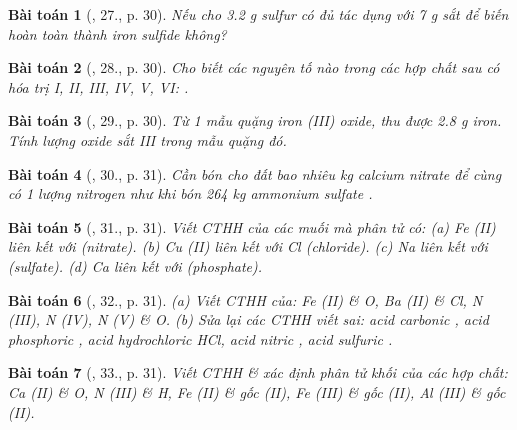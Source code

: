 \documentclass{article}
\newtheorem{baitoan}{Bài toán}
\begin{document}
\begin{baitoan}[\cite{An_Hoa_Hoc_nang_cao_8_9}, 27., p. 30]
	Nếu cho {\rm3.2 g} sulfur có đủ tác dụng với {\rm7 g} sắt để biến hoàn toàn thành iron sulfide không?
\end{baitoan}

\begin{baitoan}[\cite{An_Hoa_Hoc_nang_cao_8_9}, 28., p. 30]
	Cho biết các nguyên tố nào trong các hợp chất sau có hóa trị {\rm I, II, III, IV, V, VI: }.
\end{baitoan}

\begin{baitoan}[\cite{An_Hoa_Hoc_nang_cao_8_9}, 29., p. 30]
	Từ 1 mẫu quặng iron (III) oxide, thu được {\rm2.8 g} iron. Tính lượng oxide sắt III trong mẫu quặng đó.
\end{baitoan}

\begin{baitoan}[\cite{An_Hoa_Hoc_nang_cao_8_9}, 30., p. 31]
	Cần bón cho đất bao nhiêu {\rm kg} calcium nitrate để cùng có 1 lượng nitrogen như khi bón {\rm264 kg} ammonium sulfate {\rm{}}.
\end{baitoan}

\begin{baitoan}[\cite{An_Hoa_Hoc_nang_cao_8_9}, 31., p. 31]
	Viết {\rm CTHH} của các muối mà phân tử có: (a) {\rm Fe (II)} liên kết với {\rm{}} (nitrate). (b) {\rm Cu (II)} liên kết với {\rm Cl} (chloride). (c) {\rm Na} liên kết với {\rm{}} (sulfate). (d) {\rm Ca} liên kết với {\rm{}} (phosphate).
\end{baitoan}

\begin{baitoan}[\cite{An_Hoa_Hoc_nang_cao_8_9}, 32., p. 31]
	(a) Viết {\rm CTHH} của: {\rm Fe (II)} \& {\rm O}, {\rm Ba (II)} \& {\rm Cl}, {\rm N (III), N (IV), N (V)} \& {\rm O}. (b) Sửa lại các {\rm CTHH} viết sai:  acid carbonic {\rm{}}, acid phosphoric {\rm{}}, acid hydrochloric {\rm HCl}, acid nitric {\rm{}}, acid sulfuric {\rm{}}.
\end{baitoan}

\begin{baitoan}[\cite{An_Hoa_Hoc_nang_cao_8_9}, 33., p. 31]
	Viết {\rm CTHH} \& xác định phân tử khối của các hợp chất: {\rm Ca (II)} \& {\rm O}, {\rm N (III)} \& {\rm H}, {\rm Fe (II)} \& gốc {\rm{} (II)}, {\rm Fe (III)} \& gốc {\rm{} (II)}, {\rm Al (III)} \& gốc {\rm{} (II)}.
\end{baitoan}
\end{document}
